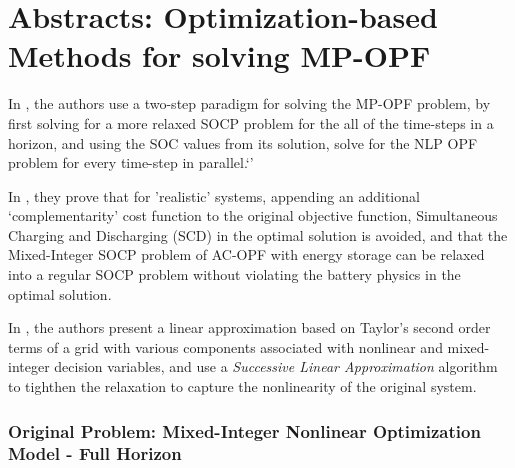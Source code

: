 
\chapter{Abstracts: Optimization-based Methods for solving MP-OPF}
In \cite{Nazir2019Jun}, the authors use a two-step paradigm for solving the MP-OPF problem, by first solving for a more relaxed SOCP problem for the all of the time-steps in a horizon, and using the SOC values from its solution, solve for the NLP OPF problem for every time-step in parallel.`'

In \cite{Nazir2018Jun}, they prove that for 'realistic' systems, appending an additional `complementarity' cost function to the original objective function, Simultaneous Charging and Discharging (SCD) in the optimal solution is avoided, and that the Mixed-Integer SOCP problem of AC-OPF with energy storage can be relaxed into a regular SOCP problem without violating the battery physics in the optimal solution.

In \cite{usman01}, the authors present a linear approximation based on Taylor's second order terms of a grid with various components associated with nonlinear and mixed-integer decision variables, and use a \textit{Successive Linear Approximation} algorithm to tighthen the relaxation to capture the nonlinearity of the original system.

\subsection*{Original Problem: Mixed-Integer Nonlinear Optimization Model - Full Horizon}


